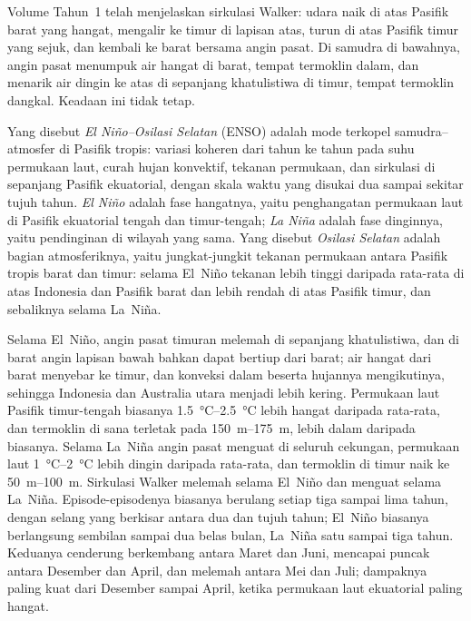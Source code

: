 Volume Tahun~1 telah menjelaskan sirkulasi Walker: udara naik di atas Pasifik barat yang hangat,
mengalir ke timur di lapisan atas, turun di atas Pasifik timur yang sejuk, dan kembali ke barat bersama angin
pasat. Di samudra di bawahnya, angin pasat menumpuk air hangat di barat, tempat termoklin
dalam, dan menarik air dingin ke atas di sepanjang khatulistiwa di timur, tempat termoklin dangkal. Keadaan ini tidak
tetap.

\begin{definition}\label{def:b2:climate-variability:enso}
Yang disebut \emph{El Niño--Osilasi Selatan} (ENSO) adalah
mode terkopel samudra--atmosfer di Pasifik tropis: variasi koheren dari tahun ke tahun pada
suhu permukaan laut, curah hujan konvektif, tekanan permukaan, dan sirkulasi di sepanjang
Pasifik ekuatorial, dengan skala waktu yang disukai dua sampai sekitar tujuh tahun. \emph{El
Niño} adalah fase hangatnya, yaitu penghangatan permukaan laut di Pasifik ekuatorial tengah dan
timur-tengah; \emph{La Niña} adalah fase dinginnya, yaitu pendinginan di
wilayah yang sama. Yang disebut \emph{Osilasi Selatan} adalah bagian atmosferiknya,
yaitu jungkat-jungkit tekanan permukaan antara Pasifik tropis barat dan timur: selama El~Niño
tekanan lebih tinggi daripada rata-rata di atas Indonesia dan Pasifik barat dan lebih rendah di atas
Pasifik timur, dan sebaliknya selama La~Niña.
\end{definition}

Selama El~Niño, angin pasat timuran melemah di sepanjang khatulistiwa, dan di barat
angin lapisan bawah bahkan dapat bertiup dari barat; air hangat dari barat menyebar ke timur, dan
konveksi dalam beserta hujannya mengikutinya, sehingga Indonesia dan Australia utara menjadi lebih kering. Permukaan laut
Pasifik timur-tengah biasanya \qtyrange{1.5}{2.5}{\celsius} lebih hangat daripada rata-rata, dan
termoklin di sana terletak pada \qtyrange{150}{175}{m}, lebih dalam daripada biasanya. Selama La~Niña angin
pasat menguat di seluruh cekungan, permukaan laut \qtyrange{1}{2}{\celsius} lebih dingin daripada
rata-rata, dan termoklin di timur naik ke \qtyrange{50}{100}{m}. Sirkulasi Walker
melemah selama El~Niño dan menguat selama La~Niña. Episode-episodenya biasanya berulang setiap tiga sampai
lima tahun, dengan selang yang berkisar antara dua dan tujuh tahun; El~Niño biasanya berlangsung sembilan sampai
dua belas bulan, La~Niña satu sampai tiga tahun. Keduanya cenderung berkembang antara Maret dan Juni,
mencapai puncak antara Desember dan April, dan melemah antara Mei dan Juli; dampaknya paling kuat
dari Desember sampai April, ketika permukaan laut ekuatorial paling hangat.

